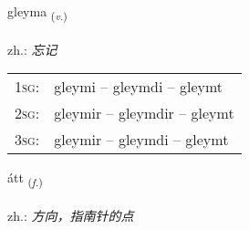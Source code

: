 \documentclass[frontgrid, backgrid]{flacards}\usepackage[]{graphicx}\usepackage[]{xcolor}
\begin{document}
\renewcommand{\flhead}{\vskip5pt \fboxsep=0pt {\small\bfseries\footnotesize Sagnorð | 动词}}
\renewcommand{\fcfoot}{\vskip5pt \fboxsep=0pt \hspace{2pt}{\small\bfseries\footnotesize 1K}}

\renewcommand{\blhead}{\vskip5pt {\small\bfseries\footnotesize Sagnorð | 动词 }}
\renewcommand{\bcfoot}{\vskip5pt \hspace{2pt}{\small\bfseries\footnotesize 1K}}


{gleyma \small{\textsubscript{(\textit{v.})}} \\[1ex] %
\textphonetic{[kleiːma]} \\
zh.: \emph{忘记} \\  [2ex]
\renewcommand*{\arraystretch}{0.8}
\begin{tabular}{p{1cm}l}
\textsc{1sg}: & gleymi -- gleymdi -- gleymt \\ 
\textsc{2sg}: & gleymir -- gleymdir -- gleymt \\ 
\textsc{3sg}: & gleymir -- gleymdi -- gleymt \\ 
\end{tabular}
}

\renewcommand{\flhead}{\vskip5pt \fboxsep=0pt {\small\bfseries\footnotesize Nafnorð | 名词}}
\renewcommand{\fcfoot}{\vskip5pt \fboxsep=0pt \hspace{2pt}{\small\bfseries\footnotesize 1K}}

\renewcommand{\blhead}{\vskip5pt {\small\bfseries\footnotesize Nafnorð | 名词 }}
\renewcommand{\bcfoot}{\vskip5pt \hspace{2pt}{\small\bfseries\footnotesize 1K}}


{átt \small{\textsubscript{(\textit{f.})}} \\[1ex] %
\textphonetic{[auht]} \\
zh.: \emph{方向，指南针的点} \\  [2ex]
\renewcommand*{\arraystretch}{0.8}
}
\end{document}
